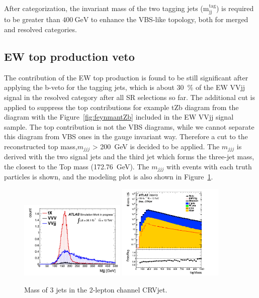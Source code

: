 After categorization, the invariant mass of the two tagging jets ($\mathrm{m}_{\mathrm{jj}}^{\text {tag}}$) is required to be greater than $400~\mathrm{GeV}$ to enhance the VBS-like topology, both for merged and resolved categories.

\subsection{EW top production veto}
\label{subsec:topveto}
The contribution of the EW top production is found to be still significant after applying the b-veto for the tagging jets, which is about 30~\% of the EW VVjj signal in the resolved category after all SR selections so far.
The additional cut is applied to suppress the top contributions for example tZb diagram from the diagram with the Figure~\ref{fig:feynmantZb} included in the EW VVjj signal sample. The top contribution is not the VBS diagrams, while we cannot separate this diagram from VBS ones in the gauge invariant way. Therefore a cut to the reconstructed top mass,$m_{jjj}$ > 200~GeV is decided to be applied. The $m_{jjj}$ is derived with the two signal jets and the third jet which forms the three-jet mass, the closest to the Top mass (172.76~GeV). The $m_{jjj}$ with events with each truth particles is shown, and the modeling plot is also shown in Figure~\ref{fig:2leptopMass}. 
\begin{figure}[H]
    \begin{center}
      \includegraphics[width=0.45\textwidth]{figures/2lep/topMass/WZjjtopMasspeak}
      \includegraphics[width=0.45\textwidth]{figures/2lep/dataMC/C_0ptag2pjet_0ptv_CRVjet_topMass_Log}
        \caption{ Mass of 3 jets in the 2-lepton channel CRVjet.}
        \label{fig:2leptopMass}
    \end{center}
\end{figure}
